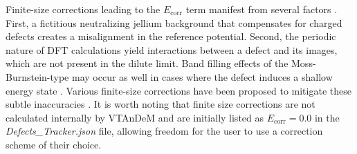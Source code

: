 \documentclass[%
 reprint,
 amsmath,amssymb,
 aps,
]{revtex4-1}
\begin{document}
Finite-size corrections leading to the $E_{\text{corr}}$ term manifest from several factors \cite{2018_Durrant}. First, a fictitious neutralizing jellium background that compensates for charged defects creates a misalignment in the reference potential. Second, the periodic nature of DFT calculations yield interactions between a defect and its images, which are not present in the dilute limit. Band filling effects of the Moss-Burnstein-type may occur as well in cases where the defect induces a shallow energy state \cite{1954_Moss, 1954_Burnstein}. Various finite-size corrections have been proposed to mitigate these subtle inaccuracies \cite{1995_Makov, 2008_Lany, 2009_Lany, 2009_Freysoldt}. It is worth noting that finite size corrections are not calculated internally by VTAnDeM and are initially listed as $E_{\text{corr}} = 0.0$ in the \textit{Defects\_Tracker.json} file, allowing freedom for the user to use a correction scheme of their choice.
\end{document}
